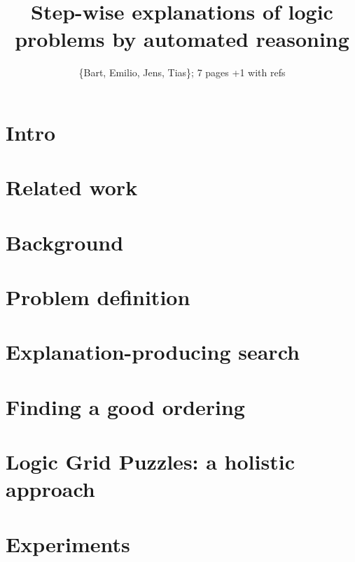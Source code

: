 \documentclass{ecai}
\begin{document}
\title{Step-wise explanations of logic problems by automated reasoning}

\author{\{Bart, Emilio, Jens, Tias\}; 7 pages +1 with refs}

\maketitle


\begin{abstract}

\end{abstract}


\section{Intro}



\section{Related work}


\section{Background}


\section{Problem definition}



\section{Explanation-producing search}\label{sec:expl-gen-prod}



\section{Finding a good ordering}



\section{Logic Grid Puzzles: a holistic approach}\label{sec:holistic}



\section{Experiments}




\end{document}

